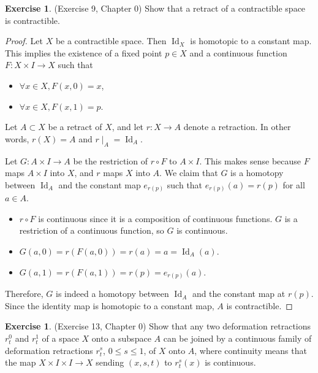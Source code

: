 \documentclass[12pt, psamsfonts]{amsart}
\theoremstyle{definition}
\newtheorem{exer}[thm]{Exercise}
\theoremstyle{remark}
\DeclareMathOperator{\Id}{Id}
\numberwithin{equation}{section}
\begin{document}
\begin{exer}{(Exercise 9, Chapter 0)}
  Show that a retract of a contractible space is contractible.
\end{exer}

\begin{proof}
  Let $X$ be a contractible space.
  Then $\Id_X$ is homotopic to a constant map.
  This implies the existence of a fixed point $p \in X$ and a continuous function $F: X \times I \rightarrow X$ such that
  \begin{itemize}
    \item
      $\forall x \in X, F(x, 0) = x$,
    \item
      $\forall x \in X, F(x, 1) = p$.
  \end{itemize}
  Let $A \subset X$ be a retract of $X$, and let $r: X \rightarrow A$ denote a retraction.
  In other words, $r(X) = A$ and $r \mid_A = \Id_A$.

  Let $G: A \times I \rightarrow A$ be the restriction of $r \circ F$ to $A \times I$.
  This makes sense because $F$ maps $A \times I$ into $X$, and $r$ maps $X$ into $A$.
  We claim that $G$ is a homotopy between $\Id_A$ and the constant map $e_{r(p)}$ such that $e_{r(p)}(a) = r(p)$ for all $a \in A$.

  \begin{itemize}
    \item
      $r \circ F$ is continuous since it is a composition of continuous functions.
      $G$ is a restriction of a continuous function, so $G$ is continuous.
    \item
      $G(a, 0) = r(F(a, 0)) = r(a) = a = \Id_A(a)$.
    \item
      $G(a, 1) = r(F(a, 1)) = r(p) = e_{r(p)}(a)$.
  \end{itemize}

  Therefore, $G$ is indeed a homotopy between $\Id_A$ and the constant map at $r(p)$.
  Since the identity map is homotopic to a constant map, $A$ is contractible.
\end{proof}

\begin{exer}{(Exercise 13, Chapter 0)}
  Show that any two deformation retractions $r_t^0$ and $r_t^1$ of a space $X$ onto a subspace $A$ can be joined by a continuous family of deformation retractions $r^s_t$, $0 \leq s \leq 1$, of $X$ onto $A$, where continuity means that the map $X \times I \times I \rightarrow X$ sending $(x, s, t)$ to $r^s_t(x)$ is continuous.
\end{exer}
\end{document}
